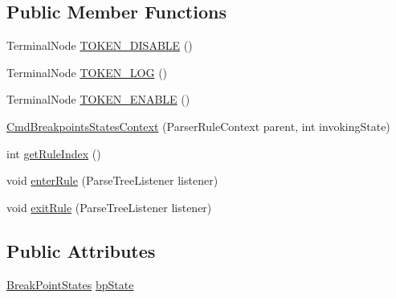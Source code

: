 \subsection*{Public Member Functions}
\begin{DoxyCompactItemize}
\item 
Terminal\+Node \hyperlink{classgov_1_1nasa_1_1jpf_1_1inspector_1_1client_1_1parser_1_1_console_grammar_parser_1_1_cmd_breakpoints_states_context_a49d3f7018e1814206bd2f395f9e5c3f2}{T\+O\+K\+E\+N\+\_\+\+D\+I\+S\+A\+B\+LE} ()
\item 
Terminal\+Node \hyperlink{classgov_1_1nasa_1_1jpf_1_1inspector_1_1client_1_1parser_1_1_console_grammar_parser_1_1_cmd_breakpoints_states_context_a037c987ae08e87ecc5e1ef79047ee6e5}{T\+O\+K\+E\+N\+\_\+\+L\+OG} ()
\item 
Terminal\+Node \hyperlink{classgov_1_1nasa_1_1jpf_1_1inspector_1_1client_1_1parser_1_1_console_grammar_parser_1_1_cmd_breakpoints_states_context_a62c91aa6184626ea587a1e03bea09776}{T\+O\+K\+E\+N\+\_\+\+E\+N\+A\+B\+LE} ()
\item 
\hyperlink{classgov_1_1nasa_1_1jpf_1_1inspector_1_1client_1_1parser_1_1_console_grammar_parser_1_1_cmd_breakpoints_states_context_ad39b292a0f2f1922d67599a41b0a9abe}{Cmd\+Breakpoints\+States\+Context} (Parser\+Rule\+Context parent, int invoking\+State)
\item 
int \hyperlink{classgov_1_1nasa_1_1jpf_1_1inspector_1_1client_1_1parser_1_1_console_grammar_parser_1_1_cmd_breakpoints_states_context_afe566cf691e15d57ea3709581d92cc87}{get\+Rule\+Index} ()
\item 
void \hyperlink{classgov_1_1nasa_1_1jpf_1_1inspector_1_1client_1_1parser_1_1_console_grammar_parser_1_1_cmd_breakpoints_states_context_a9add56d875d3c17cd1e5beb8ffa59dbe}{enter\+Rule} (Parse\+Tree\+Listener listener)
\item 
void \hyperlink{classgov_1_1nasa_1_1jpf_1_1inspector_1_1client_1_1parser_1_1_console_grammar_parser_1_1_cmd_breakpoints_states_context_a2ae6044e1af396edb771ae4de0eacad7}{exit\+Rule} (Parse\+Tree\+Listener listener)
\end{DoxyCompactItemize}
\subsection*{Public Attributes}
\begin{DoxyCompactItemize}
\item 
\hyperlink{enumgov_1_1nasa_1_1jpf_1_1inspector_1_1interfaces_1_1_break_point_states}{Break\+Point\+States} \hyperlink{classgov_1_1nasa_1_1jpf_1_1inspector_1_1client_1_1parser_1_1_console_grammar_parser_1_1_cmd_breakpoints_states_context_a9c52de9d989cd933567a1c799d241e4b}{bp\+State}
\end{DoxyCompactItemize}



